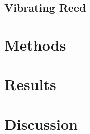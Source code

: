 \documentclass[a4paper,12pt]{article}
\begin{document}
\subsection{Vibrating Reed}
\label{sec:reed}

\section{Methods}
\label{sec:meth}


\section{Results}
\label{sec:res}

\section{Discussion}
\label{sec:disk}

\end{document}
